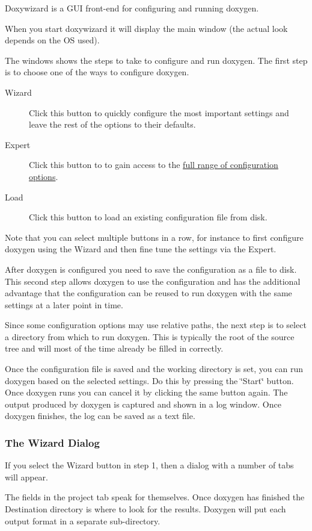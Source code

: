 Doxywizard is a GUI front-end for configuring and running doxygen.

When you start doxywizard it will display the main window (the actual look depends on the OS used).

 The windows shows the steps to take to configure and run doxygen. The first step is to choose one of the ways to configure doxygen. \begin{description}
\item[Wizard]Click this button to quickly configure the most important settings and leave the rest of the options to their defaults. \item[Expert]Click this button to to gain access to the \hyperlink{config}{full range of configuration options}. \item[Load]Click this button to load an existing configuration file from disk. \end{description}
Note that you can select multiple buttons in a row, for instance to first configure doxygen using the Wizard and then fine tune the settings via the Expert.

After doxygen is configured you need to save the configuration as a file to disk. This second step allows doxygen to use the configuration and has the additional advantage that the configuration can be reused to run doxygen with the same settings at a later point in time.

Since some configuration options may use relative paths, the next step is to select a directory from which to run doxygen. This is typically the root of the source tree and will most of the time already be filled in correctly.

Once the configuration file is saved and the working directory is set, you can run doxygen based on the selected settings. Do this by pressing the \char`\"{}Start\char`\"{} button. Once doxygen runs you can cancel it by clicking the same button again. The output produced by doxygen is captured and shown in a log window. Once doxygen finishes, the log can be saved as a text file.

\subsubsection*{The Wizard Dialog}

If you select the Wizard button in step 1, then a dialog with a number of tabs will appear.

 The fields in the project tab speak for themselves. Once doxygen has finished the Destination directory is where to look for the results. Doxygen will put each output format in a separate sub-directory.


